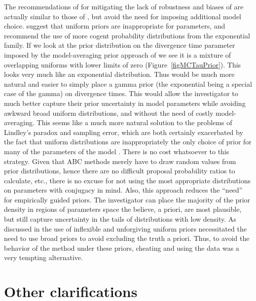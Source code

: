 \documentclass[letterpaper,12pt]{article}
\begin{document}
\begin{linenumbers}
The recommendations of \citet{Oaks2012} for mitigating the lack of robustness
and biases of \msb are actually similar to those of \citet{Hickerson2013},
but avoid the need for imposing additional model choice.
\citet{Oaks2012} suggest that uniform priors are inappropriate for parameters,
and recommend the use of more cogent probability distributions from the
exponential family.
If we look at the prior distribution on the divergence time parameter \divt{}
imposed by the model-averaging prior approach of \citet{Hickerson2013} we see
it is a mixture of overlapping uniforms with lower limits of zero
(Figure~\ref{figMCTauPrior}).
This looks very much like an exponential distribution.
Thus would be much more natural and easier to simply place a gamma prior (the
exponential being a special case of the gamma) on divergence times.
This would allow the investigator to much better capture their prior
uncertainty in model parameters while avoiding awkward broad uniform
distributions, and without the need of costly model-averaging.
This seems like a much more natural solution to the problems of Lindley's
paradox and sampling error, which are both certainly exacerbated by the fact
that uniform distributions are inappropriately the only choice of prior for
many of the parameters of the \msb model \citep[\divt{}, \ancestralTheta{},
, , \bottleTime{},
, , \locusMutationRateScalar,
\migrationRate{}, \recombinationRate;][]{Oaks2012}.
There is no cost whatsoever to this strategy.
Given that ABC methods merely have to draw random values from prior
distributions, hence there are no difficult proposal probability ratios to
calculate, etc., there is no excuse for not using the most appropriate
distributions on parameters with conjugacy in mind.
Also, this approach reduces the ``need'' for empirically guided priors.
The investigator can place the majority of the prior density in regions
of parameters space the believe, a priori, are most plausible, but still
capture uncertainty in the tails of distributions with low density.
As discussed in \citet{Oaks2012} the use of inflexible and unforgiving uniform
priors necessitated the need to use broad priors to avoid excluding the truth a
priori.
Thus, to avoid the   behavior of the method under these priors, cheating
and using the data was a very tempting alternative.



\section*{Other clarifications}


\end{linenumbers}
\end{document}
